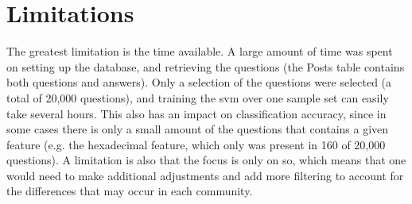 \begin{comment}
The quality of a question is based on the votes given by the users of the StackOverflow community. 
Therefore the vote score was used to label the question as either good (score > 0) or bad (score < 0). 
This is justified by the fact that you can draw a comparison between the peer-review process used in academia and the peer-review process used in StackOverflow. 
The process starts with someone posting a question, which is then read, scored and given feedback (through comments or answers). 
The feedback can then improve the question through edits by the poster, based on the feedback given 
(e.g. adding additional information or explaining how the given problem(s) occurred).
\vspace{0.5em}\newline
Scikit-learns \gls{svm} implementation is based on libsvm \cite{ChangLin2011}, but it is simpler to use. 
In addition, scikit-learn focuses on code quality\footnote{Coverage on their GitHub repository was 94\% on 06. May 2015.}, 
to ensure that everything works as it should \cite[p.~3]{PedregosaVaroquauxGramfortEtAl2011}.
\vspace{0.5em}\newline
It is not a lot of research being done related to asking and defining good questions. 
Although the focus is only on programming questions, it can still be useful to improve question quality. 
Even if you cannot predict if it is a good question, you can still avoid asking a bad questions. 
This in turn can help to improve the question quality (at least acceptability), and avoid asking questions that will be closed or ignored on StackOverflow.
\end{comment}

\section{Limitations}
\label{sec:limitations}
The greatest limitation is the time available. 
A large amount of time was spent on setting up the database, and retrieving the questions (the Posts table contains both questions and answers).
Only a selection of the questions were selected (a total of 20,000 questions), and training the \gls{svm} over one sample set can easily take several hours. 
This also has an impact on classification accuracy, since in some cases there is only a small amount of the questions that contains a given feature 
(e.g. the hexadecimal feature, which only was present in 160 of 20,000 questions).
A limitation is also that the focus is only on \gls{so}, which means that one would need to make additional adjustments and add more filtering to account 
for the differences that may occur in each community.
 
